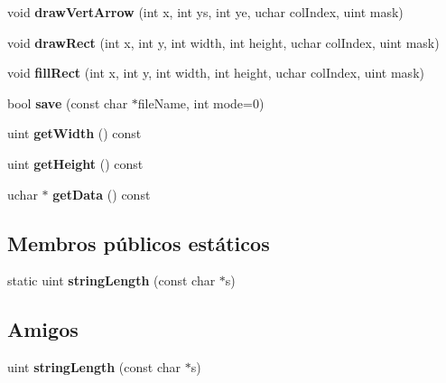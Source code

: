 \begin{DoxyCompactItemize}
\item 
\hypertarget{class_image_a55cc4b04b1aa3ac4702b7fce1a20b7b5}{void {\bfseries draw\-Vert\-Arrow} (int x, int ys, int ye, uchar col\-Index, uint mask)}\label{class_image_a55cc4b04b1aa3ac4702b7fce1a20b7b5}

\item 
\hypertarget{class_image_a402af1ab2710b30fad1abde7fb903201}{void {\bfseries draw\-Rect} (int x, int y, int width, int height, uchar col\-Index, uint mask)}\label{class_image_a402af1ab2710b30fad1abde7fb903201}

\item 
\hypertarget{class_image_a58c36e995a469c7cef551b8b320efe8c}{void {\bfseries fill\-Rect} (int x, int y, int width, int height, uchar col\-Index, uint mask)}\label{class_image_a58c36e995a469c7cef551b8b320efe8c}

\item 
\hypertarget{class_image_a22e07798f434bb321c842664fe46ac88}{bool {\bfseries save} (const char $\ast$file\-Name, int mode=0)}\label{class_image_a22e07798f434bb321c842664fe46ac88}

\item 
\hypertarget{class_image_a290563bfc82e1ad627ac10bda066729e}{uint {\bfseries get\-Width} () const }\label{class_image_a290563bfc82e1ad627ac10bda066729e}

\item 
\hypertarget{class_image_ae84b5088898ed1f2a0ca2da13d7ebfe8}{uint {\bfseries get\-Height} () const }\label{class_image_ae84b5088898ed1f2a0ca2da13d7ebfe8}

\item 
\hypertarget{class_image_a89e09937c5a7c7895f61597d73212afc}{uchar $\ast$ {\bfseries get\-Data} () const }\label{class_image_a89e09937c5a7c7895f61597d73212afc}

\end{DoxyCompactItemize}
\subsection*{Membros públicos estáticos}
\begin{DoxyCompactItemize}
\item 
\hypertarget{class_image_ad852761eb588da8bc8241791f343783a}{static uint {\bfseries string\-Length} (const char $\ast$s)}\label{class_image_ad852761eb588da8bc8241791f343783a}

\end{DoxyCompactItemize}
\subsection*{Amigos}
\begin{DoxyCompactItemize}
\item 
\hypertarget{class_image_a6e1a5dfb3e352b50accfb9c02e2060cf}{uint {\bfseries string\-Length} (const char $\ast$s)}\label{class_image_a6e1a5dfb3e352b50accfb9c02e2060cf}

\end{DoxyCompactItemize}


